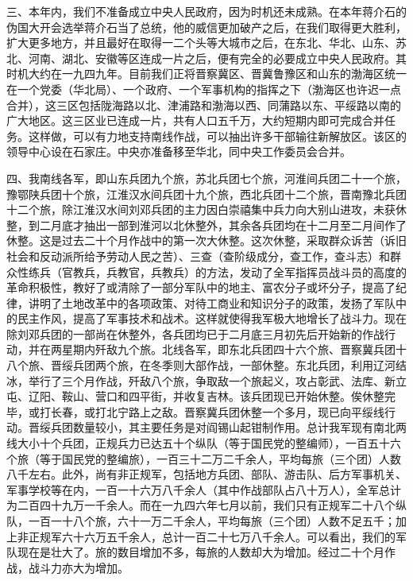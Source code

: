 三、本年内，我们不准备成立中央人民政府，因为时机还未成熟。在本年蒋介石的伪国大开会选举蒋介石当了总统，他的威信更加破产之后，在我们取得更大胜利，扩大更多地方，并且最好在取得一二个头等大城市之后，在东北、华北、山东、苏北、河南、湖北、安徽等区连成一片之后，便有完全的必要成立中央人民政府。其时机大约在一九四九年。目前我们正将晋察冀区、晋冀鲁豫区和山东的渤海区统一在一个党委（华北局）、一个政府、一个军事机构的指挥之下（渤海区也许迟一点合并），这三区包括陇海路以北、津浦路和渤海以西、同蒲路以东、平绥路以南的广大地区。这三区业已连成一片，共有人口五千万，大约短期内即可完成合并任务。这样做，可以有力地支持南线作战，可以抽出许多干部输往新解放区。该区的领导中心设在石家庄。中央亦准备移至华北，同中央工作委员会合并。

四、我南线各军，即山东兵团九个旅，苏北兵团七个旅，河淮间兵团二十一个旅，豫鄂陕兵团十个旅，江淮汉水间兵团十九个旅，西北兵团十二个旅，晋南豫北兵团十二个旅，除江淮汉水间刘邓兵团的主力因白崇禧集中兵力向大别山进攻，未获休整，到二月底才抽出一部到淮河以北休整外，其余各兵团均在十二月至二月间作了休整。这是过去二十个月作战中的第一次大休整。这次休整，采取群众诉苦（诉旧社会和反动派所给予劳动人民之苦）、三查（查阶级成分，查工作，查斗志）和群众性练兵（官教兵，兵教官，兵教兵）的方法，发动了全军指挥员战斗员的高度的革命积极性，教好了或清除了一部分军队中的地主、富农分子或坏分子，提高了纪律，讲明了土地改革中的各项政策、对待工商业和知识分子的政策，发扬了军队中的民主作风，提高了军事技术和战术。这样就使得我军极大地增长了战斗力。现在除刘邓兵团的一部尚在休整外，各兵团均已于二月底三月初先后开始新的作战行动，并在两星期内歼敌九个旅。北线各军，即东北兵团四十六个旅、晋察冀兵团十八个旅、晋绥兵团两个旅，在冬季则大部作战，一部休整。东北兵团，利用辽河结冰，举行了三个月作战，歼敌八个旅，争取敌一个旅起义，攻占彰武、法库、新立屯、辽阳、鞍山、营口和四平街，并收复吉林。该兵团现已开始休整。俟休整完毕，或打长春，或打北宁路上之敌。晋察冀兵团休整一个多月，现已向平绥线行动。晋绥兵团数量较小，其主要任务是对阎锡山起钳制作用。总计我军现有南北两线大小十个兵团，正规兵力已达五十个纵队（等于国民党的整编师），一百五十六个旅（等于国民党的整编旅），一百三十二万二千余人，平均每旅（三个团）人数八千左右。此外，尚有非正规军，包括地方兵团、部队、游击队、后方军事机关、军事学校等在内，一百一十六万八千余人（其中作战部队占八十万人），全军总计为二百四十九万一千余人。而在一九四六年七月以前，我们只有正规军二十八个纵队，一百一十八个旅，六十一万二千余人，平均每旅（三个团）人数不足五千；加上非正规军六十六万五千余人，总计一百二十七万八千余人。可以看出，我们的军队现在是壮大了。旅的数目增加不多，每旅的人数却大为增加。经过二十个月作战，战斗力亦大为增加。

